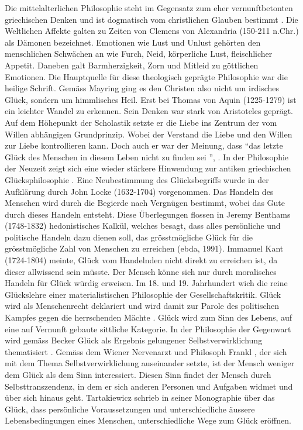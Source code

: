 Die mittelalterlichen Philosophie steht im Gegensatz zum eher vernunftbetonten griechischen Denken und ist dogmatisch vom christlichen Glauben bestimmt \cite{Mayring:2003}. Die Weltlichen Affekte galten zu Zeiten von Clemens von Alexandria (150-211 n.Chr.) als Dämonen bezeichnet. Emotionen wie Lust und Unlust gehörten den menschlichen Schwächen an wie Furch, Neid, körperliche Lust, fleischlicher Appetit. Daneben galt Barmherzigkeit, Zorn und Mitleid zu göttlichen Emotionen. Die Hauptquelle für diese theologisch geprägte Philosophie war die heilige Schrift. Gemäss Mayring \cite{Mayring:1991} ging es den Christen also nicht um irdisches Glück, sondern um himmlisches Heil. Erst bei Thomas von Aquin (1225-1279) ist ein leichter Wandel zu erkennen. Sein Denken war stark von Aristoteles geprägt. Auf dem Höhepunkt der Scholastik setzte er die Liebe ins Zentrum der vom Willen abhängigen Grundprinzip. Wobei der Verstand die Liebe und den Willen zur Liebe kontrollieren kann. Doch auch er war der Meinung, dass \textquotedblleft das letzte Glück des Menschen in diesem Leben nicht zu finden sei \textquotedblright, \cite{Becker:1994}. \newline
In der Philosophie der Neuzeit zeigt sich eine wieder stärkere Hinwendung zur antiken griechischen Glücksphilosophie \cite{Mayring:1991}. Eine Neubestimmung des Glücksbegriffs wurde in der Aufklärung durch John Locke (1632-1704) vorgenommen. Das Handeln des Menschen wird durch die Begierde nach Vergnügen bestimmt, wobei das Gute durch dieses Handeln entsteht. Diese Überlegungen flossen in Jeremy Benthams (1748-1832) hedonistisches Kalkül, welches besagt, dass alles persönliche und politische Handeln dazu dienen soll, das grösstmögliche Glück für die grösstmögliche Zahl von Menschen zu erreichen (ebda, 1991). Immanuel Kant (1724-1804) meinte, Glück vom Handelnden nicht direkt zu erreichen ist, da dieser allwissend sein müsste. Der Mensch könne sich nur durch moralisches Handeln für Glück würdig erweisen. Im 18. und 19. Jahrhundert wich die reine Glückslehre einer materialistischen Philosophie der Gesellschaftskritik. Glück wird als Menschenrecht deklariert und wird damit zur Parole des politischen Kampfes gegen die herrschenden Mächte \cite{Jones:1953}. Glück wird zum Sinn des Lebens, auf eine auf Vernunft gebaute sittliche Kategorie. \newline
In der Philosophie der Gegenwart wird gemäss Becker \cite{Becker:1994} Glück als Ergebnis gelungener Selbstverwirklichung thematisiert \cite{Kambartel:1978}. Gemäss dem Wiener Nervenarzt und Philosoph Frankl \cite{Frankl:1976}, der sich mit dem Thema Selbstverwirklichung auseinander setzte, ist der Mensch weniger dem Glück als dem Sinn interessiert. Diesen Sinn findet der Mensch durch Selbsttranszendenz, in dem er sich anderen Personen und Aufgaben widmet und über sich hinaus geht. Tartakiewicz \cite{Tartakiewicz:1984} schrieb in seiner Monographie über das Glück, dass persönliche Voraussetzungen und unterschiedliche äussere Lebensbedingungen eines Menschen, unterschiedliche Wege zum Glück eröffnen. \newline
